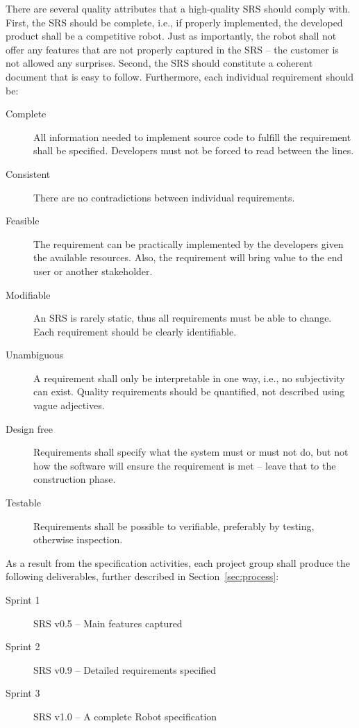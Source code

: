 \documentclass{scrreprt}
\begin{document}
There are several quality attributes that a high-quality SRS should comply with. First, the SRS should be complete, i.e., if properly implemented, the developed product shall be a competitive robot. Just as importantly, the robot shall not offer any features that are not properly captured in the SRS -- the customer is not allowed any surprises. Second, the SRS should constitute a coherent document that is easy to follow. Furthermore, each individual requirement should be:

\begin{description}
\item[Complete] All information needed to implement source code to fulfill the requirement shall be specified. Developers must not be forced to read between the lines.
\item[Consistent] There are no contradictions between individual requirements.
\item[Feasible] The requirement can be practically implemented by the developers given the available resources. Also, the requirement will bring value to the end user or another stakeholder.
\item[Modifiable] An SRS is rarely static, thus all requirements must be able to change. Each requirement should be clearly identifiable.
\item[Unambiguous] A requirement shall only be interpretable in one way, i.e., no subjectivity can exist. Quality requirements should be quantified, not described using vague adjectives.
\item[Design free] Requirements shall specify what the system must or must not do, but not how the software will ensure the requirement is met -- leave that to the construction phase.
\item[Testable] Requirements shall be possible to verifiable, preferably by testing, otherwise inspection. 
\end{description}

As a result from the specification activities, each project group shall produce the following deliverables, further described in Section~\ref{sec:process}:
\begin{description}
\item[Sprint 1] SRS v0.5 -- Main features captured
\item[Sprint 2] SRS v0.9 -- Detailed requirements specified
\item[Sprint 3] SRS v1.0 -- A complete Robot specification
\end{description}
\end{document}
